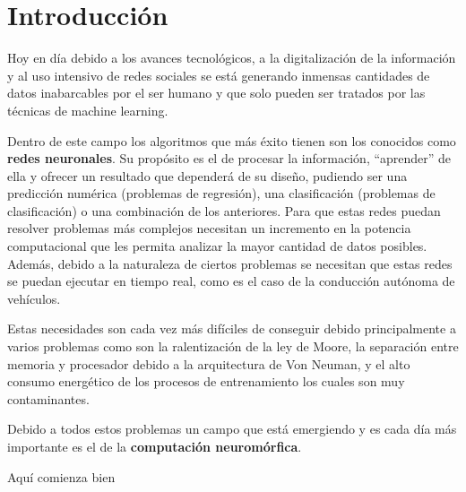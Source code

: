 \chapter{Introducción}
Hoy en día debido a los avances tecnológicos, a la digitalización de la información y al uso intensivo de redes sociales se está generando inmensas cantidades de datos inabarcables por el ser humano y que solo pueden ser tratados por las técnicas de machine learning.  

Dentro de este campo los algoritmos que más éxito tienen son los conocidos como \textbf{redes neuronales}. Su propósito es el de procesar la información, ``aprender'' de ella y ofrecer un resultado que dependerá de su diseño, pudiendo ser una predicción numérica (problemas de regresión), una clasificación (problemas de clasificación) o una combinación de los anteriores. Para que estas redes puedan resolver problemas más complejos necesitan un incremento en la potencia computacional que les permita analizar la mayor cantidad de datos posibles. Además, debido a la naturaleza de ciertos problemas se necesitan que estas redes se puedan ejecutar en tiempo real, como es el caso de la conducción autónoma de vehículos. 

Estas necesidades son cada vez más difíciles de conseguir debido principalmente a varios problemas como son la ralentización de la ley de Moore, la separación entre memoria y procesador debido a la arquitectura de Von Neuman, y el alto consumo energético de los procesos de entrenamiento los cuales son muy contaminantes.  

Debido a todos estos problemas un campo que está emergiendo y es cada día más importante es el de la \textbf{computación neuromórfica}. 


\newpage
Aquí comienza bien